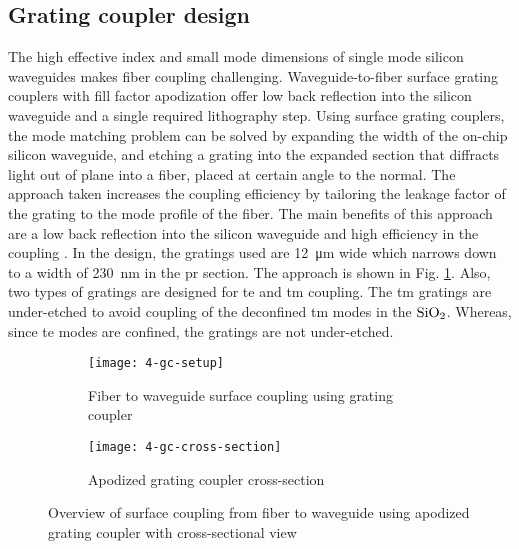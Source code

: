 \documentclass[../report.tex]{subfiles}
\begin{document}
\subsection{Grating coupler design}
The high effective index and small mode dimensions of single mode silicon waveguides makes fiber coupling challenging. Waveguide-to-fiber surface grating couplers with fill factor apodization offer low back reflection into the silicon waveguide and a single required lithography step. Using surface grating couplers, the mode matching problem can be solved by expanding the width of the on-chip silicon waveguide, and etching a grating into the expanded section that diffracts light out of plane into a fiber, placed at certain angle to the normal. The approach taken increases the coupling efficiency by tailoring the leakage factor of the grating to the mode profile of the fiber. The main benefits of this approach are a low back reflection into the silicon waveguide and high efficiency in the coupling \cite{grating_coupler}. In the design, the gratings used are \SI{12}{\micro\meter} wide which narrows down to a width of \SI{230}{\nano\meter} in the \gls{pr} section. The approach is shown in Fig. \ref{fig:4_gc_setup}. Also, two types of gratings are designed for \gls{te} and \gls{tm} coupling. The \gls{tm} gratings are under-etched to avoid coupling of the deconfined \gls{tm} modes in the $\mathrm{SiO_{2}}$. Whereas, since \gls{te} modes are confined, the gratings are not under-etched. 

\begin{figure}[H] %
	\begin{subfigure}[t]{0.45\textwidth}
		\texttt{[image: 4-gc-setup]}
		\caption{Fiber to waveguide surface coupling using grating coupler}
		\label{fig:4_gc_setup}
	\end{subfigure}
	\hfill
	\begin{subfigure}[t]{0.45\textwidth}
		\texttt{[image: 4-gc-cross-section]}
		\caption{Apodized grating coupler cross-section}
		\label{fig:4_gc_cross_section}
	\end{subfigure}
	\caption{Overview of surface coupling from fiber to waveguide using apodized grating coupler with cross-sectional view}
\end{figure}
\end{document}
